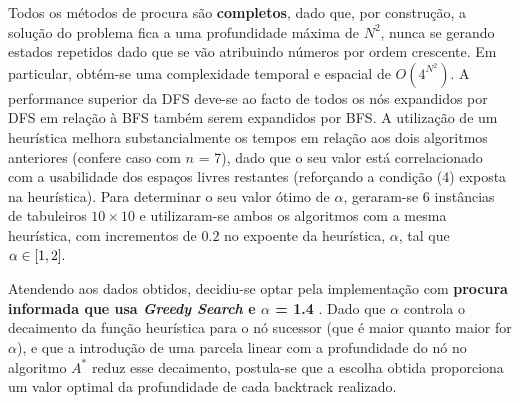 \documentclass[12pt]{exam}
\renewcommand\_{\textunderscore\linebreak[1]}
\begin{document}
        \indent Todos os métodos de procura são \textbf{completos}, dado que, por construção, a solução do problema fica a uma profundidade máxima de $N^2$, nunca se gerando estados repetidos dado que se vão atribuindo números por ordem crescente. Em particular, obtém-se uma complexidade temporal e espacial de $O(4^{N^2})$. A performance superior da DFS deve-se ao facto de todos os nós expandidos por DFS em relação à BFS também serem expandidos por BFS. A utilização de um heurística melhora substancialmente os tempos em relação aos dois algoritmos anteriores (confere caso com $n$ = 7), dado que o seu valor está correlacionado com a usabilidade dos espaços livres restantes (reforçando a condição (4) exposta na heurística). Para determinar o seu valor ótimo de $\alpha$, geraram-se 6 instâncias de tabuleiros $10 \times 10$ e utilizaram-se ambos os algoritmos com a mesma heurística, com incrementos de $0.2$ no expoente da heurística, $\alpha$, tal que $\alpha \in \interval{1}{2}.$
        \vspace{-4.5mm}
        \begin{figure}[ht!]
        \centering
        \qquad
        \label{fig:example}%
        \end{figure}

        \indent Atendendo aos dados obtidos, decidiu-se optar pela implementação com \textbf{procura informada que usa \textit{Greedy Search} e $\alpha$ = 1.4 }. Dado que $\alpha$ controla o decaimento da função heurística para o nó sucessor (que é maior quanto maior for $\alpha$), e que a introdução de uma parcela linear com a profundidade do nó no algoritmo $A^*$ reduz esse decaimento, postula-se que a escolha obtida proporciona um valor optimal da profundidade de cada backtrack realizado.
\end{document}
